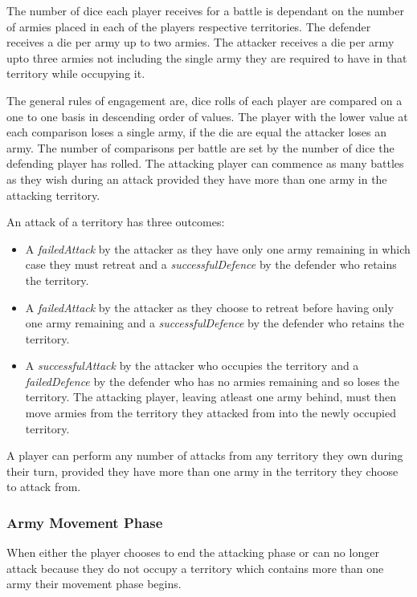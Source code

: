 \documentclass[parskip]{cs4rep}
\begin{document}
The number of dice each player receives for a battle is dependant on the number of armies placed in each of the players respective territories. The defender receives a die per army up to two armies. The attacker receives a die per army upto three armies not including the single army they are required to have in that territory while occupying it. 

The general rules of engagement are, dice rolls of each player are compared on a one to one basis in descending order of values. The player with the lower value at each comparison loses a single army, if the die are equal the attacker loses an army. The number of comparisons per battle are set by the number of dice the defending player has rolled. The attacking player can commence as many battles as they wish during an attack provided they have more than one army in the attacking territory.

An attack of a territory has three outcomes:

\begin{itemize}
\item
A \textit{failedAttack} by the attacker as they have only one army remaining in which case they must retreat and a \textit{successfulDefence} by the defender who retains the territory.
\item
A \textit{failedAttack} by the attacker as they choose to retreat before having only one army remaining and a \textit{successfulDefence} by the defender who retains the territory.
\item
A \textit{successfulAttack} by the attacker who occupies the territory and a \textit{failedDefence} by the defender who has no armies remaining and so loses the territory. The attacking player, leaving atleast one army behind, must then move armies from the territory they attacked from into the newly occupied territory.
\end{itemize}

A player can perform any number of attacks from any territory they own during their turn, provided they have more than one army in the territory they choose to attack from.

\subsubsection{Army Movement Phase}

When either the player chooses to end the attacking phase or can no longer attack because they do not occupy a territory which contains more than one army their movement phase begins.
\end{document}
